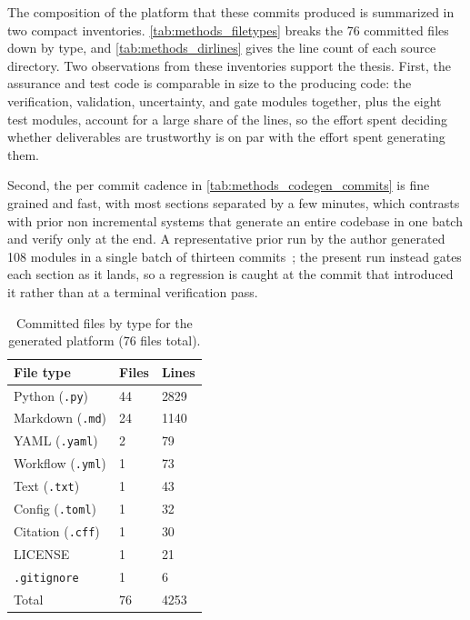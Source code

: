 The composition of the platform that these commits produced is summarized in two
compact inventories. \autoref{tab:methods_filetypes} breaks the 76 committed
files down by type, and \autoref{tab:methods_dirlines} gives the line count of
each source directory. Two observations from these inventories support the
thesis. First, the assurance and test code is comparable in size to the
producing code: the verification, validation, uncertainty, and gate modules
together, plus the eight test modules, account for a large share of the lines, so
the effort spent deciding whether deliverables are trustworthy is on par with the
effort spent generating them. 

Second, the per commit cadence in
\autoref{tab:methods_codegen_commits} is fine grained and fast, with most
sections separated by a few minutes, which contrasts with prior non incremental
systems that generate an entire codebase in one batch and verify only at the end.
A representative prior run by the author generated 108 modules in a single batch
of thirteen commits~\cite{kawchak2026sponsor}; the present run instead gates each
section as it lands, so a regression is caught at the commit that introduced it
rather than at a terminal verification pass.

\begin{table}[H]
\caption{Committed files by type for the generated platform (76 files total).}
\label{tab:methods_filetypes}
\centering
\begin{tabularx}{\textwidth}{>{\raggedright\arraybackslash}X C{3.0cm} C{3.0cm}}
\toprule
\textbf{File type} & \textbf{Files} & \textbf{Lines} \\
\midrule
  Python (\texttt{.py})            & 44 & 2829 \\
  Markdown (\texttt{.md})          & 24 & 1140 \\
  YAML (\texttt{.yaml})            & 2  & 79 \\
  Workflow (\texttt{.yml})         & 1  & 73 \\
  Text (\texttt{.txt})             & 1  & 43 \\
  Config (\texttt{.toml})          & 1  & 32 \\
  Citation (\texttt{.cff})         & 1  & 30 \\
  LICENSE                          & 1  & 21 \\
  \texttt{.gitignore}              & 1  & 6 \\
  \midrule
  Total                            & 76 & 4253 \\
\bottomrule
\end{tabularx}
\end{table}


